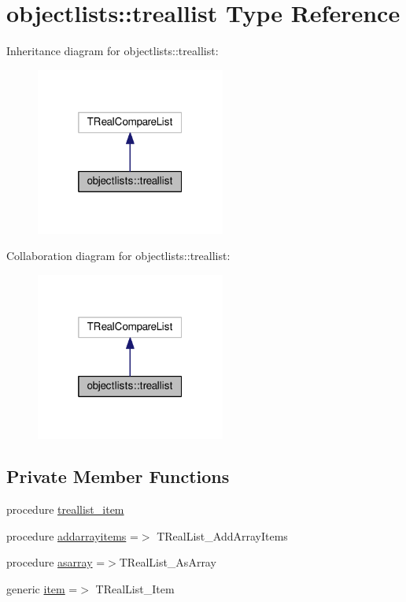 \hypertarget{structobjectlists_1_1treallist}{}\section{objectlists\+:\+:treallist Type Reference}
\label{structobjectlists_1_1treallist}


Inheritance diagram for objectlists\+:\+:treallist\+:
\nopagebreak
\begin{figure}[H]
\begin{center}
\leavevmode
\includegraphics[width=176pt]{structobjectlists_1_1treallist__inherit__graph}
\end{center}
\end{figure}


Collaboration diagram for objectlists\+:\+:treallist\+:
\nopagebreak
\begin{figure}[H]
\begin{center}
\leavevmode
\includegraphics[width=176pt]{structobjectlists_1_1treallist__coll__graph}
\end{center}
\end{figure}
\subsection*{Private Member Functions}
\begin{DoxyCompactItemize}
\item 
procedure \mbox{\hyperlink{structobjectlists_1_1treallist_a32c935dc0996f12c74ffccdd24e279f3}{treallist\+\_\+item}}
\item 
procedure \mbox{\hyperlink{structobjectlists_1_1treallist_a149b5b112cf9d9b836824e01d304a444}{addarrayitems}} =$>$ T\+Real\+List\+\_\+\+Add\+Array\+Items
\item 
procedure \mbox{\hyperlink{structobjectlists_1_1treallist_a11149a9b5310d400a8419590c942a7b9}{asarray}} =$>$T\+Real\+List\+\_\+\+As\+Array
\item 
generic \mbox{\hyperlink{structobjectlists_1_1treallist_a25a81392742f84618bc6be4a81064b0d}{item}} =$>$ T\+Real\+List\+\_\+\+Item
\end{DoxyCompactItemize}


